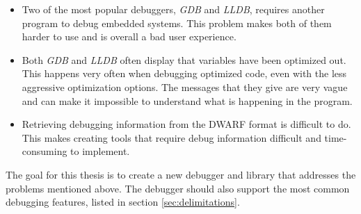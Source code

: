 \begin{itemize}
\item Two of the most popular debuggers, \emph{GDB} and \emph{LLDB}, requires another program to debug embedded systems.
This problem makes both of them harder to use and is overall a bad user experience.

\item Both \emph{GDB} and \emph{LLDB} often display that variables have been optimized out.
This happens very often when debugging optimized code, even with the less aggressive optimization options.
The messages that they give are very vague and can make it impossible to understand what is happening in the program.

\item Retrieving debugging information from the \gls{DWARF} format is difficult to do. 
This makes creating tools that require debug information difficult and time-consuming to implement.

\end{itemize}

The goal for this thesis is to create a new debugger and library that addresses the problems mentioned above.
The debugger should also support the most common debugging features, listed in section \ref{sec:delimitations}.









